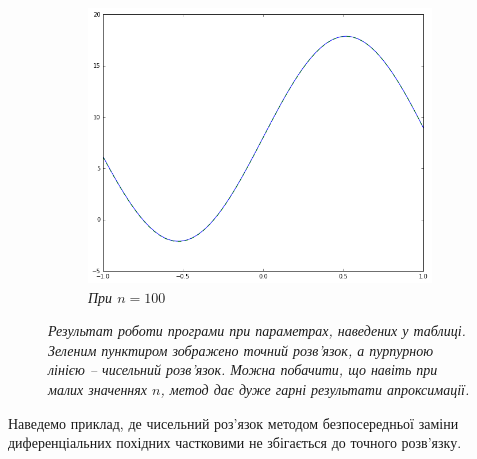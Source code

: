 \begin{figure}[h!]
\begin{subfigure}{.5\textwidth}
  \centering
  \includegraphics[width=.9\linewidth]{res1_n100}
  \caption{\it При \(n = 100\)}
  \label{fig:sub2}
\end{subfigure}
\caption{\it Результат роботи програми \cite{SourceCode} при параметрах, наведених у таблиці. Зеленим пунктиром зображено точний розв'язок, а пурпурною лінією -- чисельний розв'язок. Можна побачити, що навіть при малих значеннях \(n\), метод дає дуже гарні результати апроксимації.}
\label{fig:res1}
\end{figure}


\newpage
Наведемо приклад, де чисельний роз'язок методом безпосередньої заміни диференціальних похідних частковими не збігається до точного розв'язку.

